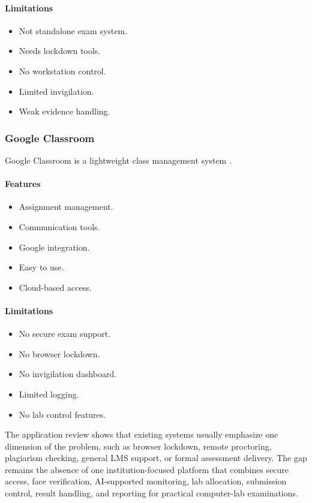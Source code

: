 \paragraph{Limitations}
\begin{itemize}[noitemsep]
\item Not standalone exam system.
\item Needs lockdown tools.
\item No workstation control.
\item Limited invigilation.
\item Weak evidence handling.
\end{itemize}

\subsubsection{Google Classroom}
Google Classroom is a lightweight class management system \cite{gclassroom1}.

\paragraph{Features}
\begin{itemize}[noitemsep]
\item Assignment management.
\item Communication tools.
\item Google integration.
\item Easy to use.
\item Cloud-based access.
\end{itemize}

\paragraph{Limitations}
\begin{itemize}[noitemsep]
\item No secure exam support.
\item No browser lockdown.
\item No invigilation dashboard.
\item Limited logging.
\item No lab control features.
\end{itemize}

The application review shows that existing systems usually emphasize one dimension of the problem, such as browser lockdown, remote proctoring, plagiarism checking, general LMS support, or formal assessment delivery. The gap remains the absence of one institution-focused platform that combines secure access, face verification, AI-supported monitoring, lab allocation, submission control, result handling, and reporting for practical computer-lab examinations.

